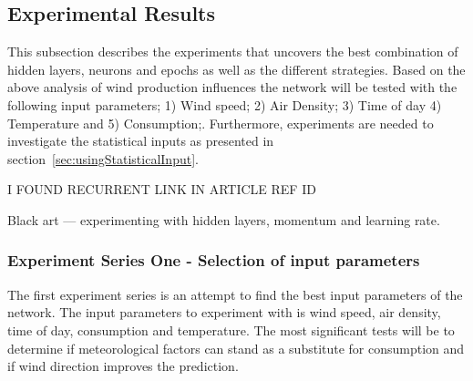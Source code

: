 \subsection{Experimental Results}
This subsection describes the experiments that uncovers the best combination of hidden layers, neurons and epochs as well as the different strategies. Based on the above analysis of wind production influences the network will be tested with the following input parameters; 1) Wind speed; 2) Air Density; 3) Time of day 4) Temperature and 5) Consumption;. Furthermore, experiments are needed to investigate the statistical inputs as presented in section~\ref{sec:usingStatisticalInput}.


I FOUND RECURRENT LINK IN ARTICLE REF ID

Black art --- experimenting with hidden layers, momentum and learning rate. 


\subsubsection{Experiment Series One - Selection of input parameters}
The first experiment series is an attempt to find the best input parameters of the network. The input parameters to experiment with is wind speed, air density, time of day, consumption and temperature. The most significant tests will be to determine if meteorological factors can stand as a substitute for consumption and if wind direction improves the prediction.


